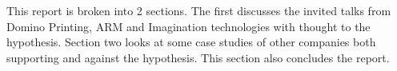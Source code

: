 
This report is broken into 2 sections. 
The first discusses the invited talks from Domino Printing, ARM and Imagination technologies with thought to the hypothesis. 
Section two looks at some case studies of other companies both supporting and against the hypothesis. 
This section also concludes the report.






